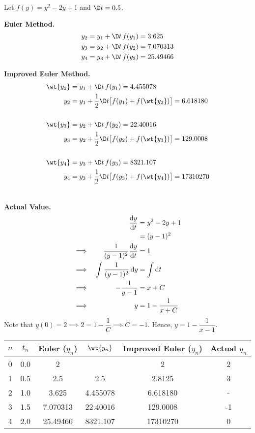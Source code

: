 \documentclass{echw}
\begin{document}
    \solution
        Let $f(y) = y^2 - 2y + 1$ and $\D t = 0.5$.

        \textbf{Euler Method.}
        \begin{align*}
            y_2 &= y_1 + \D t \, f(y_1) = 3.625\\
            y_3 &= y_2 + \D t \, f(y_2) = 7.070313\\
            y_4 &= y_3 + \D t \, f(y_3) = 25.49466\\
        \end{align*}

        \textbf{Improved Euler Method.}
        \begin{align*}
            \wt{y_2} &= y_1 + \D t \, f(y_1) = 4.455078\\
            y_2 &= y_1 + \dfrac12 \D t \big[f(y_1) + f(\wt{y_2})\big] = 6.618180\\\\
            \wt{y_3} &= y_2 + \D t \, f(y_2) = 22.40016\\
            y_3 &= y_2 + \dfrac12 \D t \big[f(y_2) + f(\wt{y_3})\big] = 129.0008\\\\
            \wt{y_4} &= y_3 + \D t \, f(y_3) = 8321.107\\
            y_4 &= y_3 + \dfrac12 \D t \big[f(y_3) + f(\wt{y_4})\big] = 17310270\\\\
        \end{align*}

        \textbf{Actual Value.}
        \begin{alignat*}{2}
            && \dfrac{\mathrm{d} y}{\mathrm{d} t} &= y^2 - 2y + 1\\
            && &= (y-1)^2\\
            \implies&& \dfrac1{(y-1)^2} \dfrac{\mathrm{d} y}{\mathrm{d} t} &= 1\\
            \implies&& \int \dfrac1{(y-1)^2} \mathop{\mathrm{d}y} &= \int \mathop{\mathrm{d}t}\\
            \implies&& -\dfrac{1}{y-1} &= x + C\\
            \implies&& y &= 1 - \dfrac{1}{x+C}
        \end{alignat*}
        Note that $y(0) = 2 \implies 2 = 1 - \dfrac1C \implies C = -1$. Hence, $y = 1 - \dfrac1{x-1}$.

        \begin{table}[H]
            \centering
            \begin{tabular}{|c|c|c|c|c|c|}
            \hline
            $n$ & $t_n$ & Euler ($y_n$) & $\wt{y_n}$ & Improved Euler ($y_n$) & Actual $y_n$ \\ \hline\hline
            0 & 0.0 & 2 & \cellcolor{black!10} & 2 & 2 \\ \hline
            1 & 0.5 & 2.5 & 2.5 & 2.8125 & 3 \\ \hline
            2 & 1.0 & 3.625 & 4.455078 & 6.618180 & - \\ \hline
            3 & 1.5 & 7.070313 & 22.40016 & 129.0008 & -1 \\ \hline
            4 & 2.0 & 25.49466 & 8321.107 & 17310270 & 0 \\ \hline
            \end{tabular}
        \end{table}
\end{document}
